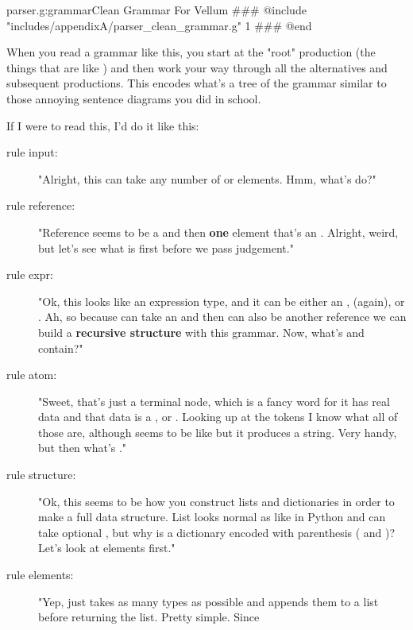 \begin{code}{parser.g:grammar}{Clean Grammar For Vellum}
### @include "includes/appendixA/parser_clean_grammar.g" 1
### @end
\end{code}

When you read a grammar like this, you start at the "root" production (the
things that are like ) and then work your way
through all the alternatives and subsequent productions.  This encodes
what's a tree of the grammar similar to those annoying sentence diagrams
you did in school.

If I were to read this, I'd do it like this:

\begin{description}
\item[rule input:] "Alright, this can take any number of  or
     elements.  Hmm, what's  do?"
\item[rule reference:] "Reference seems to be a  and then {\bf one} element
    that's an .  Alright, weird, but let's see what  is
    first before we pass judgement."
\item[rule expr:] "Ok, this looks like an expression type, and it can be either an
    ,  (again), or .  Ah, so
    because  can take an  and then  can
    also be another reference we can build a {\bf recursive structure} with this
    grammar.  Now, what's  and  contain?"
\item[rule atom:] "Sweet, that's just a terminal node, which is a fancy word for it has
    real data and that data is a ,  or .
    Looking up at the tokens I know what all of those are, although
     seems to be like  but it produces a
    string.  Very handy, but then what's ."
\item[rule structure:] "Ok, this seems to be how you construct lists and dictionaries
    in order to make a full data structure.  List looks normal as like in Python
    and can take optional , but why is a dictionary encoded with
    parenthesis ( and )?  Let's look at elements first."
\item[rule elements:] "Yep, just takes as many  types as possible and
    appends them to a list before returning the list.  Pretty simple.  Since

\end{description}
